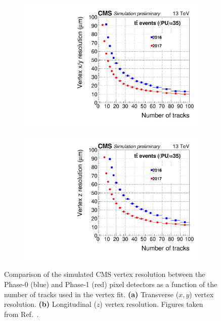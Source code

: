 \begin{figure}[!htbp]
    \centering
    \begin{subfigure}[b]{0.49\textwidth}
        \centering
        \includegraphics[width=\textwidth]{Figures/Chapter3/Pixel_Vertex_XY_Resolution.pdf}
        \caption{}
    \end{subfigure}
    \begin{subfigure}[b]{0.49\textwidth}
        \centering
        \includegraphics[width=\textwidth]{Figures/Chapter3/Pixel_Vertex_Z_Resolution.pdf}
        \caption{}
    \end{subfigure}
\caption[Vertex resolution comparison between Phase-0 and Phase-1 pixel detectors]{Comparison of the simulated \ac{CMS} vertex resolution between the Phase-0 (blue) and Phase-1 (red) pixel detectors as a function of the number of tracks used in the vertex fit. \textbf{(a)} Transverse ($x,y$) vertex resolution. \textbf{(b)} Longitudinal ($z$) vertex resolution. Figures taken from Ref.~\cite{Pixel_Vertex_Performance}.}

\label{Figure:Chapter3_Pixel_Vertex_Resolution}
\end{figure}


